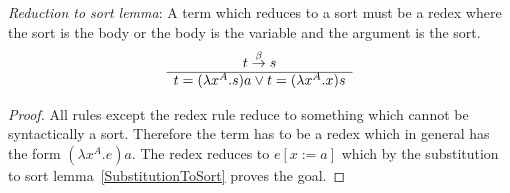 \begin{lemma}
    \emph{Reduction to sort lemma}: A term which reduces to a sort must be a
    redex where the sort is the body or the body is the variable and the
    argument is the sort.
    $$
    \begin{array}{c} 
        t \stackrel{\beta}{\to} s
     \\ \hline 
        t = (\lambda x^A. s) a \lor t = (\lambda x^A. x)s
    \end{array}
    $$

    \begin{proof}
        All rules except the redex rule reduce to something which cannot be
        syntactically a sort. Therefore the term has to be a redex which in
        general has the form $(\lambda x^A.e) a$. The redex reduces to $e[x:=a]$
        which by the substitution to sort lemma~\ref{SubstitutionToSort} proves
        the goal.
    \end{proof}
\end{lemma}


